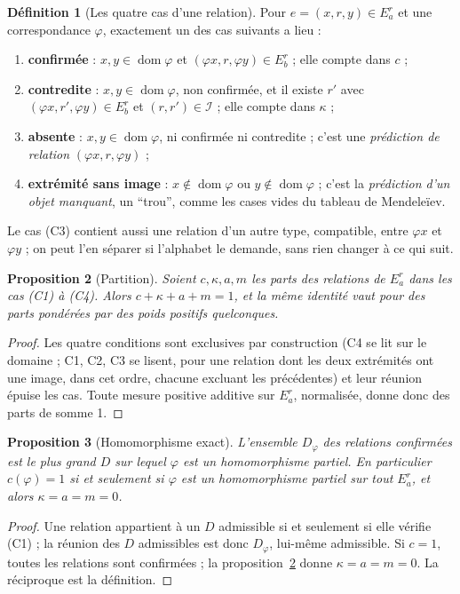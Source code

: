 \documentclass[11pt,a4paper]{article}
\theoremstyle{definition}
\newtheorem{definition}{Définition}[section]
\theoremstyle{plain}
\newtheorem{proposition}[definition]{Proposition}
\newcommand{\Inc}{\mathcal{I}}
\newcommand{\dom}{\operatorname{dom}}
\begin{document}
\begin{definition}[Les quatre cas d'une relation]
\label{def:quatrecas}
Pour $e=(x,r,y)\in E^r_a$ et une correspondance $\varphi$, exactement un des cas suivants a lieu
\cite[correction (2)]{complement89} :
\begin{enumerate}[label=(C\arabic*)]
\item \textbf{confirmée} : $x,y\in\dom\varphi$ et $(\varphi x,r,\varphi y)\in E^r_b$ ; elle compte dans $c$ ;
\item \textbf{contredite} : $x,y\in\dom\varphi$, non confirmée, et il existe $r'$ avec
$(\varphi x,r',\varphi y)\in E^r_b$ et $(r,r')\in\Inc$ ; elle compte dans $\kappa$ ;
\item \textbf{absente} : $x,y\in\dom\varphi$, ni confirmée ni contredite ; c'est une
\emph{prédiction de relation} $(\varphi x,r,\varphi y)$ ;
\item \textbf{extrémité sans image} : $x\notin\dom\varphi$ ou $y\notin\dom\varphi$ ; c'est la
\emph{prédiction d'un objet manquant}, un \enquote{trou}, comme les cases vides du tableau de
Mendeleïev.
\end{enumerate}
\end{definition}

Le cas (C3) contient aussi une relation d'un autre type, compatible, entre $\varphi x$ et
$\varphi y$ ; on peut l'en séparer si l'alphabet le demande, sans rien changer à ce qui suit.

\begin{proposition}[Partition]
\label{prop:partition}
Soient $c,\kappa,a,m$ les parts des relations de $E^r_a$ dans les cas (C1) à (C4). Alors
$c+\kappa+a+m=1$, et la même identité vaut pour des parts pondérées par des poids positifs
quelconques.
\end{proposition}
\begin{proof}
Les quatre conditions sont exclusives par construction (C4 se lit sur le domaine ; C1, C2, C3 se
lisent, pour une relation dont les deux extrémités ont une image, dans cet ordre, chacune excluant
les précédentes) et leur réunion épuise les cas. Toute mesure positive additive sur $E^r_a$,
normalisée, donne donc des parts de somme 1.
\end{proof}

\begin{proposition}[Homomorphisme exact]
\label{prop:homoexact}
L'ensemble $D_\varphi$ des relations confirmées est le plus grand $D$ sur lequel $\varphi$ est un
homomorphisme partiel. En particulier $c(\varphi)=1$ si et seulement si $\varphi$ est un
homomorphisme partiel sur tout $E^r_a$, et alors $\kappa=a=m=0$.
\end{proposition}
\begin{proof}
Une relation appartient à un $D$ admissible si et seulement si elle vérifie (C1) ; la réunion des
$D$ admissibles est donc $D_\varphi$, lui-même admissible. Si $c=1$, toutes les relations sont
confirmées ; la proposition~\ref{prop:partition} donne $\kappa=a=m=0$. La réciproque est la
définition.
\end{proof}
\end{document}
